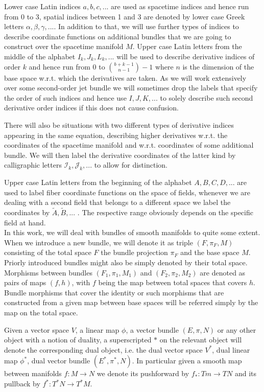 \documentclass[a4paper,12pt, DIV=14, BCOR=5mm, twoside, headsepline, numbers=noenddot]{scrbook}
\begin{document}
Lower case Latin indices $a,b,c,...$ are used as spacetime indices and hence run from 0 to 3, spatial indices between 1 and 3 are denoted by lower case Greek letters $\alpha,\beta,\gamma,...$. In addition to that, we will use further types of indices to describe coordinate functions on additional bundles that we are going to construct over the spacetime manifold $M$. Upper case Latin letters from the middle of the alphabet $I_k,J_k,L_k,...$ will be used to describe derivative indices of order $k$ and hence run from $0$ to $\binom{b+k-1}{n-1}-1$ where $n$ is the dimension of the base space w.r.t. which the derivatives are taken. As we will work extensively over some second-order jet bundle we will sometimes drop the labels that specify the order of such indices and hence use $I,J,K,...$ to solely describe such second derivative order indices if this does not cause confusion.

There will also be situations with two different types of derivative indices appearing in the same equation, describing higher derivatives w.r.t. the coordinates of the spacetime manifold and w.r.t. coordinates of some additional bundle. We will then label the derivative coordinates of the latter kind by calligraphic letters $\mathcal{I}_k, \mathcal{J}_k,...$ to allow for distinction.

Upper case Latin letters from the beginning of the alphabet $A,B,C,D,...$ are used to label fiber coordinate functions on the space of fields, whenever we are dealing with a second field that belongs to a different space we label the coordinates by $\tilde{A}, \tilde{B},...$ . The respective range obviously depends on the specific field at hand.\\

In this work, we will deal with bundles of smooth manifolds to quite some extent. When we introduce a new bundle, we will denote it as triple $(F,\pi_F,M)$ consisting of the total space $F$ the bundle projection $\pi_F$ and the base space $M$. Priorly introduced bundles might also be simply denoted by their total space. Morphisms between bundles $(F_1,\pi_1,M_1)$ and $(F_2,\pi_2,M_2)$ are denoted as pairs of maps $(f,h)$, with $f$ being the map between total spaces that covers $h$. Bundle morphisms that cover the identity or such morphisms that are constructed from a given map between base spaces will be referred simply by the map on the total space.

Given a vector space $V$, a linear map $\phi$, a vector bundle $(E,\pi,N)$ or any other object with a notion of duality, a superscripted $\ast$ on the relevant object will denote the corresponding dual object, i.e. the dual vector space $V^{\ast}$, dual linear map $\phi^{\ast}$, dual vector bundle $(E^{\ast}, \pi^{\ast},N)$. In particular given a smooth map between manifolds $f : M \rightarrow N$ we denote its pushforward by $f_{\ast} : Tm \rightarrow TN$ and its pullback by $f^{\ast} : T^{\ast}N \rightarrow T^{\ast}M$.
\end{document}
